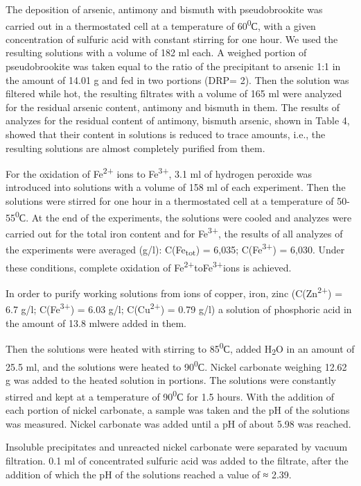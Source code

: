 \begin{multicols}{2}
The deposition of arsenic, antimony and bismuth with pseudobrookite was
carried out in a thermostated cell at a temperature of
60\textsuperscript{0}С, with a given concentration of sulfuric acid with
constant stirring for one hour. We used the resulting solutions with a
volume of 182 ml each. A weighed portion of pseudobrookite was taken
equal to the ratio of the precipitant to arsenic 1:1 in the amount of
14.01 g and fed in two portions (DRP= 2). Then the solution was filtered
while hot, the resulting filtrates with a volume of 165 ml were analyzed
for the residual arsenic content, antimony and bismuth in them. The
results of analyzes for the residual content of antimony, bismuth
arsenic, shown in Table 4, showed that their content in solutions is
reduced to trace amounts, i.e., the resulting solutions are almost
completely purified from them.

For the oxidation of Fe\textsuperscript{2+} ions to
Fe\textsuperscript{3+}, 3.1 ml of hydrogen peroxide was introduced into
solutions with a volume of 158 ml of each experiment. Then the solutions
were stirred for one hour in a thermostated cell at a temperature of
50-55\textsuperscript{0}С. At the end of the experiments, the solutions
were cooled and analyzes were carried out for the total iron content and
for Fe\textsuperscript{3+}, the results of all analyzes of the
experiments were averaged (g/l): C(Fe\textsubscript{tot}) = 6,035;
C(Fe\textsuperscript{3+}) = 6,030. Under these conditions, complete
oxidation of Fe\textsuperscript{2+}toFe\textsuperscript{3+}ions is
achieved.

In order to purify working solutions from ions of copper, iron, zinc
(C(Zn\textsuperscript{2+}) = 6.7 g/l; C(Fe\textsuperscript{3+}) = 6.03
g/l; C(Cu\textsuperscript{2+}) = 0.79 g/l) a solution of phosphoric acid
in the amount of 13.8 mlwere added in them.

Then the solutions were heated with stirring to 85\textsuperscript{0}С,
added H\textsubscript{2}O in an amount of 25.5 ml, and the solutions
were heated to 90\textsuperscript{0}С. Nickel carbonate weighing 12.62 g
was added to the heated solution in portions. The solutions were
constantly stirred and kept at a temperature of 90\textsuperscript{0}С
for 1.5 hours. With the addition of each portion of nickel carbonate, a
sample was taken and the pH of the solutions was measured. Nickel
carbonate was added until a pH of about 5.98 was reached.

Insoluble precipitates and unreacted nickel carbonate were separated by
vacuum filtration. 0.1 ml of concentrated sulfuric acid was added to the
filtrate, after the addition of which the pH of the solutions reached a
value of ≈ 2.39.


\end{multicols}
